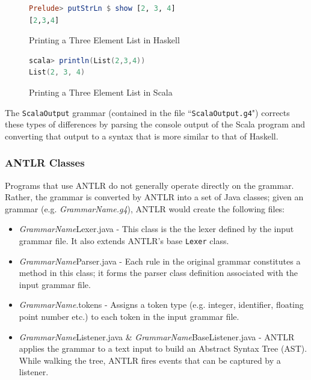 \documentclass{report}
\begin{document}
\begin{figure}[H]
\begin{mdframed}
\begin{lstlisting}[language=Haskell]
Prelude> putStrLn $ show [2, 3, 4]
[2,3,4]
\end{lstlisting}
\end{mdframed}
\caption{Printing a Three Element List in Haskell}\label{fig:printListHaskell}
\end{figure}

\begin{figure}[H]
\begin{mdframed}
\begin{lstlisting}[language=Scala]
scala> println(List(2,3,4))
List(2, 3, 4)
\end{lstlisting}
\end{mdframed}
\caption{Printing a Three Element List in Scala}\label{fig:printListScala}
\end{figure}

The \texttt{ScalaOutput} grammar (contained in the file ``\texttt{ScalaOutput.g4}") corrects these types of differences by parsing the console output of the Scala program and converting that output to a syntax that is more similar to that of Haskell.

\subsubsection{ANTLR Classes}

Programs that use ANTLR do not generally operate directly on the grammar.  Rather, the grammar is converted by ANTLR into a set of Java classes; given an  grammar (e.g. \emph{GrammarName.g4}),  ANTLR would create the following files:

\begin{itemize}
	\item \emph{GrammarName}Lexer.java - This class is the the lexer defined by the input grammar file.  It also extends ANTLR's base \texttt{Lexer} class.
	
	\item \emph{GrammarName}Parser.java - Each rule in the original grammar constitutes a method in this class; it forms the parser class definition associated with the input grammar file.
	
	\item \emph{GrammarName}.tokens - Assigns a token type (e.g. integer, identifier, floating point number etc.) to each token in the input grammar file.
	
	\item \emph{GrammarName}Listener.java \& \emph{GrammarName}BaseListener.java - ANTLR applies the grammar to a text input to build an Abstract Syntax Tree (AST).  While walking the tree, ANTLR fires events that can be captured by a listener\cite{antlrDefinitiveReference}.
	
\end{itemize}
\end{document}
